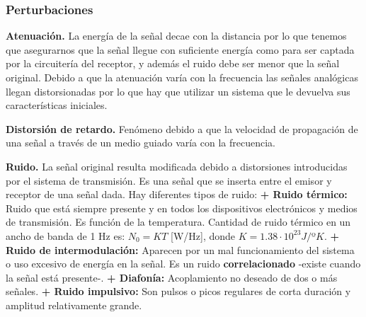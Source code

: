 \documentclass[10pt,a4paper]{article}
\begin{document}
\subsubsection{Perturbaciones}
\begin{description}
\item \textbf{Atenuación.} La energía de la señal decae con la distancia por lo que tenemos que asegurarnos que la señal llegue con suficiente energía como para ser captada por la circuitería del receptor, y además el ruido debe ser menor que la señal original. Debido a que la atenuación varía con la frecuencia las señales analógicas llegan distorsionadas por lo que hay que utilizar un sistema que le devuelva sus características iniciales.
\item \textbf{Distorsión de retardo.} Fenómeno debido a que la velocidad de propagación de una señal a través de un medio guiado varía con la frecuencia.
\item \textbf{Ruido.} La señal original resulta modificada debido a distorsiones introducidas por el sistema de transmisión. Es una señal que se inserta entre el emisor y receptor de una señal dada. Hay diferentes tipos de ruido:
\subitem \textbf{+ Ruido térmico:} Ruido que está siempre presente y en todos los dispositivos electrónicos y medios de transmisión. Es función de la temperatura. Cantidad de ruido térmico en un ancho de banda de 1 Hz es: 
$N_0 = KT$ [W/Hz], donde $K = 1.38 \cdot 10^{23} J/$º$K$.
\subitem \textbf{+ Ruido de intermodulación:} Aparecen por un mal funcionamiento del sistema o uso excesivo de energía en la señal.
Es un ruido \textbf{correlacionado} -existe cuando la señal está presente-.
\subitem \textbf{+ Diafonía:} Acoplamiento no deseado de dos o más señales.
\subitem \textbf{+ Ruido impulsivo:} Son pulsos o picos regulares de corta duración y amplitud relativamente grande.
\end{description}
\end{document}
